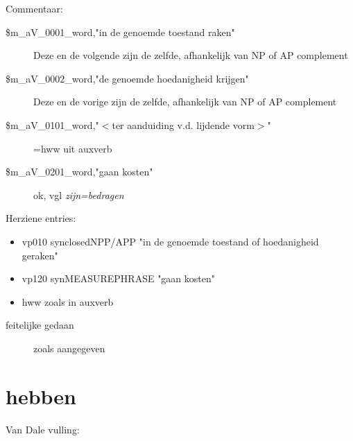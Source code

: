 Commentaar:
\begin{description}
\item[\$m\_aV\_0001\_word,"in de genoemde toestand raken"] Deze en de volgende zijn
de zelfde, afhankelijk van NP of AP complement
\item[\$m\_aV\_0002\_word,"de genoemde hoedanigheid krijgen"] Deze en de vorige zijn
de zelfde, afhankelijk van NP of AP complement\\
\item[\$m\_aV\_0101\_word,"$<$ter aanduiding v.d. lijdende vorm$>$"]=hww uit auxverb
\item[\$m\_aV\_0201\_word,"gaan kosten"]ok, vgl {\em  zijn=bedragen}
\end{description}

Herziene entries:

\begin{itemize}
  \item vp010 synclosedNPP/APP "in de genoemde toestand of
                                           hoedanigheid geraken"
  \item vp120 synMEASUREPHRASE "gaan kosten"
  \item hww zoals in auxverb
\end{itemize}


\begin{description}
\item[feitelijke gedaan] zoals aangegeven
\end{description}


\newpage
\section{hebben}


Van Dale vulling:\\

